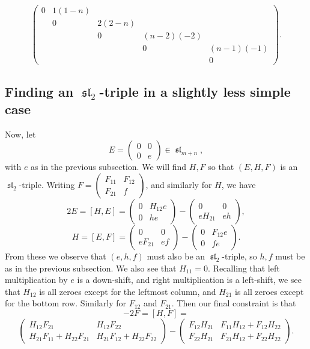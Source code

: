 \documentclass[12pt,psamsfonts]{article}
\DeclareMathOperator{\spl}{\mathfrak{sl}}
\begin{document}
\[\begin{pmatrix}
    0 & 1 (1 - n) \\
      & 0 & 2 (2 - n) \\
    & & 0 & (n - 2) (-2) \\
    & & & 0 & (n - 1) (-1)\\
    & &  & & 0
\end{pmatrix}.\]

\subsection{Finding an \(\spl_2\)-triple in a slightly less simple case}
Now, let 
\[E = \begin{pmatrix}
    0 & 0 \\
    0 & e
\end{pmatrix} \in \spl_{m + n},\]
with \(e\) as in the previous subsection.
We will find \(H, F\) so that \((E, H, F)\) is an \(\spl_2\)-triple.
Writing \(F = \begin{pmatrix}
    F_{11} & F_{12} \\
    F_{21} & f
\end{pmatrix}\), and similarly for \(H\), we have
\[2E = [H, E] = \begin{pmatrix}
    0 & H_{12}e \\
    0 & he
\end{pmatrix} - \begin{pmatrix}
    0 & 0 \\
    e H_{21} & eh
\end{pmatrix},\]
\[H = [E, F] = \begin{pmatrix}
    0 & 0 \\
    e F_{21} & ef
\end{pmatrix} - \begin{pmatrix}
    0 & F_{12}e \\
    0 & fe
\end{pmatrix}.\]
From these we observe that \((e, h, f)\) must also be an \(\spl_2\)-triple, so \(h, f\) must be as in the previous subsection.
We also see that \(H_{11} = 0\).
Recalling that left multiplication by \(e\) is a down-shift, and right multiplication is a left-shift, we see that \(H_{12}\) is all zeroes except for the leftmost column, and \(H_{21}\) is all zeroes except for the bottom row.
Similarly for \(F_{12}\) and \(F_{21}\).
Then our final constraint is that 
\[-2F = [H, F] = \]
\[\begin{pmatrix}
    H_{12} F_{21} & H_{12} F_{22} \\
    H_{21} F_{11} + H_{22} F_{21} & H_{21} F_{12} + H_{22} F_{22}
\end{pmatrix} - \begin{pmatrix}
    F_{12} H_{21} & F_{11} H_{12} + F_{12} H_{22} \\
    F_{22} H_{21} & F_{21} H_{12} + F_{22} H_{22}
\end{pmatrix}.\]
\end{document}
